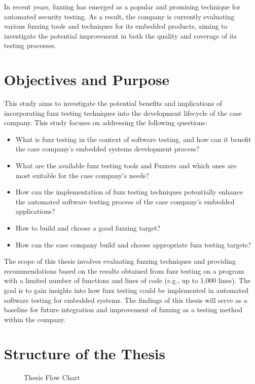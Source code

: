 In recent years, fuzzing has emerged as a popular and promising technique for
automated security testing. As a result, the company is currently evaluating various
fuzzing tools and techniques for its embedded products, aiming to investigate the
potential improvement in both the quality and coverage of its testing processes.


\section{Objectives and Purpose}

This study aims to investigate the potential benefits and implications of incorporating fuzz
testing techniques into the development lifecycle of the case company.
This study focuses on addressing the following questions:

\begin{itemize}
        \item What is fuzz testing in the context of software testing,
        and how can it benefit the case company's embedded systems development process?
        \item What are the available fuzz testing tools and \gls{Fuzzers} and which ones are
        most suitable for the case company's needs?
        \item How can the implementation of fuzz testing techniques potentially
        enhance the automated software testing process of the case company's embedded applications?
        \item How to build and choose a good fuzzing target?
        \item How can the case company build and choose appropriate fuzz testing targets?
\end{itemize}

The scope of this thesis involves evaluating fuzzing techniques and providing recommendations
based on the results obtained from fuzz testing on a program with a limited number of functions
and lines of code (e.g., up to 1,000 lines). The goal is to gain insights into how fuzz testing
could be implemented in automated software testing for embedded systems. The findings of
this thesis will serve as a baseline for future integration and improvement of fuzzing as a
testing method within the company.
\clearpage

\section{Structure of the Thesis}
\begin{figure}[h]
        \centering
        \caption{Thesis Flow Chart}\label{fig:thesis_structure}
\end{figure}

\clearpage